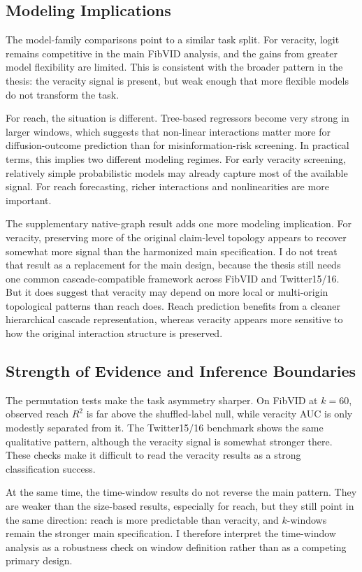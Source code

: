 \subsection{Modeling Implications}
The model-family comparisons point to a similar task split. For veracity, logit remains competitive in the main FibVID analysis, and the gains from greater model flexibility are limited. This is consistent with the broader pattern in the thesis: the veracity signal is present, but weak enough that more flexible models do not transform the task.

For reach, the situation is different. Tree-based regressors become very strong in larger windows, which suggests that non-linear interactions matter more for diffusion-outcome prediction than for misinformation-risk screening. In practical terms, this implies two different modeling regimes. For early veracity screening, relatively simple probabilistic models may already capture most of the available signal. For reach forecasting, richer interactions and nonlinearities are more important.

The supplementary native-graph result adds one more modeling implication. For veracity, preserving more of the original claim-level topology appears to recover somewhat more signal than the harmonized main specification. I do not treat that result as a replacement for the main design, because the thesis still needs one common cascade-compatible framework across FibVID and Twitter15/16. But it does suggest that veracity may depend on more local or multi-origin topological patterns than reach does. Reach prediction benefits from a cleaner hierarchical cascade representation, whereas veracity appears more sensitive to how the original interaction structure is preserved.

\subsection{Strength of Evidence and Inference Boundaries}
The permutation tests make the task asymmetry sharper. On FibVID at $k=60$, observed reach $R^2$ is far above the shuffled-label null, while veracity AUC is only modestly separated from it. The Twitter15/16 benchmark shows the same qualitative pattern, although the veracity signal is somewhat stronger there. These checks make it difficult to read the veracity results as a strong classification success.

At the same time, the time-window results do not reverse the main pattern. They are weaker than the size-based results, especially for reach, but they still point in the same direction: reach is more predictable than veracity, and $k$-windows remain the stronger main specification. I therefore interpret the time-window analysis as a robustness check on window definition rather than as a competing primary design.

